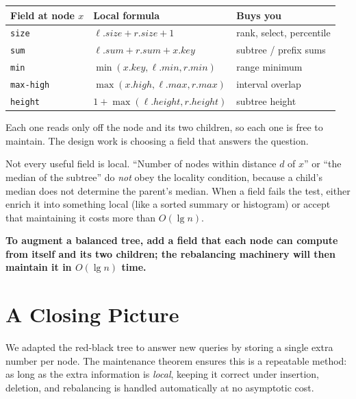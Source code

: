 \begin{center}
\begin{tabular}{lll}
\toprule
Field at node $x$ & Local formula & Buys you \\
\midrule
\texttt{size} & $\ell.\mathit{size} + r.\mathit{size} + 1$ & rank, select, percentile \\
\texttt{sum} & $\ell.\mathit{sum} + r.\mathit{sum} + x.\mathit{key}$ & subtree / prefix sums \\
\texttt{min} & $\min(x.\mathit{key}, \ell.\mathit{min}, r.\mathit{min})$ & range minimum \\
\texttt{max-high} & $\max(x.\mathit{high}, \ell.\mathit{max}, r.\mathit{max})$ & interval overlap \\
\texttt{height} & $1 + \max(\ell.\mathit{height}, r.\mathit{height})$ & subtree height \\
\bottomrule
\end{tabular}
\end{center}

Each one reads only off the node and its two children, so each one is free to
maintain. The design work is choosing a field that answers the question.

\begin{trapbox}
Not every useful field is local. ``Number of nodes within distance $d$ of $x$''
or ``the median of the subtree'' do \emph{not} obey the locality condition, because
a child's median does not determine the parent's median. When a field fails the test,
either enrich it into something local (like a sorted summary or histogram) or accept
that maintaining it costs more than $O(\lg n)$.
\end{trapbox}

\begin{recoverybox}
\textbf{To augment a balanced tree, add a field that each node can compute
from itself and its two children; the rebalancing machinery will then maintain
it in $O(\lg n)$ time.}
\end{recoverybox}

\section*{A Closing Picture}

We adapted the red-black tree to answer new queries by storing a single extra
number per node. The maintenance theorem ensures this is a repeatable method: as
long as the extra information is \emph{local}, keeping it correct under
insertion, deletion, and rebalancing is handled automatically at no asymptotic cost.

